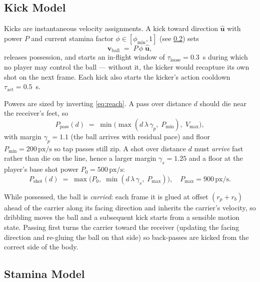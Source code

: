 \documentclass[10pt,twocolumn]{article}
\newcommand{\pxs}{\ensuremath{\,\mathrm{px/s}}}
\begin{document}
\subsection{Kick Model}\label{sec:kick}

Kicks are instantaneous velocity assignments. A kick toward direction
$\hat{\mathbf u}$ with power $P$ and current stamina factor
$\phi \in [\phi_{\min},1]$ (see \cref{sec:stamina}) sets
\begin{equation}\label{eq:kick}
\mathbf v_{\text{ball}} \;=\; P\,\phi\;\hat{\mathbf u},
\end{equation}
releases possession, and starts an in-flight window of
$\tau_{\text{loose}} = 0.3$~s during which no player may control the ball
--- without it, the kicker would recapture its own shot on the next frame.
Each kick also starts the kicker's action cooldown
$\tau_{\text{act}} = 0.5$~s.

Powers are sized by inverting \cref{eq:reach}. A pass over distance $d$
should die near the receiver's feet, so
\begin{equation}\label{eq:passpower}
P_{\text{pass}}(d) \;=\;
\min\!\bigl(\max(d\,\lambda\,\gamma_p,\; P_{\min}),\; V_{\max}\bigr),
\end{equation}
with margin $\gamma_p = 1.1$ (the ball arrives with residual pace) and
floor $P_{\min}=200\pxs$ so tap passes still zip. A shot over distance $d$
must \emph{arrive} fast rather than die on the line, hence a larger margin
$\gamma_s = 1.25$ and a floor at the player's base shot power
$P_0 = 500\pxs$:
\begin{equation}\label{eq:shotpower}
P_{\text{shot}}(d) \;=\;
\max\!\bigl(P_0,\; \min(d\,\lambda\,\gamma_s,\; P_{\max})\bigr),
\quad P_{\max}=900\pxs .
\end{equation}

While possessed, the ball is \emph{carried}: each frame it is glued at
offset $(r_p + r_b)$ ahead of the carrier along its facing direction and
inherits the carrier's velocity, so dribbling moves the ball and a
subsequent kick starts from a sensible motion state. Passing first turns
the carrier toward the receiver (updating the facing direction and
re-gluing the ball on that side) so back-passes are kicked from the correct
side of the body.

\subsection{Stamina Model}\label{sec:stamina}
\end{document}
